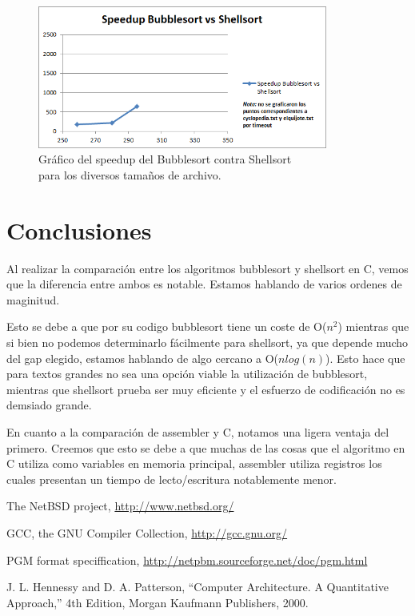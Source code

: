 \documentclass{article}
\begin{document}
\newpage
\begin{figure}[h]
	\centering
	\includegraphics[width=0.85\textwidth]{images/imagen02.png}
	\medskip
	\caption{Gráfico del speedup del Bubblesort contra Shellsort\\ para los diversos tamaños de archivo.}
\end{figure}
\bigskip\bigskip


\section{Conclusiones}

	Al realizar la comparación entre los algoritmos bubblesort y shellsort en C, vemos que la diferencia entre ambos es notable. Estamos hablando de varios ordenes de maginitud.
	\par
	Esto se debe a que por su codigo bubblesort tiene un coste de O($n^2$) mientras que si bien no podemos determinarlo fácilmente para shellsort, ya que depende mucho del gap elegido, estamos hablando de algo cercano a O($n log(n)$). Esto hace que para textos grandes no sea una opción viable la utilización de bubblesort, mientras que shellsort prueba ser muy eficiente y el esfuerzo de codificación no es demsiado grande.
	\par
	En cuanto a la comparación de assembler y C, notamos una ligera ventaja del primero. Creemos que esto se debe a que muchas de las cosas que el algoritmo en C utiliza como variables en memoria principal, assembler utiliza registros los cuales presentan un tiempo de lecto/escritura notablemente menor.
\bigskip\bigskip




\begin{thebibliography}{99}

	 The NetBSD project, \url{http://www.netbsd.org/}

	 GCC, the GNU Compiler Collection, \url{http://gcc.gnu.org/}

	 PGM format speciffication, \url{http://netpbm.sourceforge.net/doc/pgm.html}

	 J. L. Hennessy and D. A. Patterson, ``Computer Architecture. A Quantitative
	Approach,'' 4th Edition, Morgan Kaufmann Publishers, 2000.

	\end{thebibliography}
\end{document}
